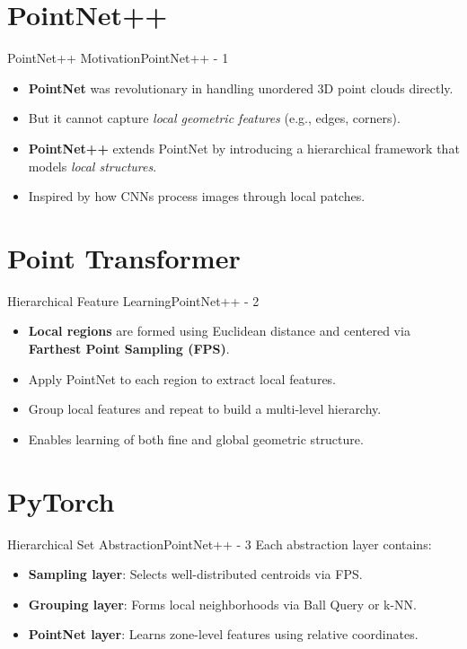 \documentclass{beamer}
\begin{document}
	\section{PointNet++}
		\begin{frame}{PointNet++ Motivation}{PointNet++ - 1}
			\begin{itemize}
				\item \textbf{PointNet} was revolutionary in handling unordered 3D point clouds directly.
				\item But it cannot capture \textit{local geometric features} (e.g., edges, corners).
				\item \textbf{PointNet++} extends PointNet by introducing a hierarchical framework that models \textit{local structures}.
				\item Inspired by how CNNs process images through local patches.
			\end{itemize}
		\end{frame}


	\section{Point Transformer}
		\begin{frame}{Hierarchical Feature Learning}{PointNet++ - 2}
			\begin{itemize}
				\item \textbf{Local regions} are formed using Euclidean distance and centered via \textbf{Farthest Point Sampling (FPS)}.
				\item Apply PointNet to each region to extract local features.
				\item Group local features and repeat to build a multi-level hierarchy.
				\item Enables learning of both fine and global geometric structure.
			\end{itemize}
		\end{frame}

		
	\section{PyTorch}
		\begin{frame}{Hierarchical Set Abstraction}{PointNet++ - 3}
			Each abstraction layer contains:
			\begin{itemize}
				\item \textbf{Sampling layer}: Selects well-distributed centroids via FPS.
				\item \textbf{Grouping layer}: Forms local neighborhoods via Ball Query or k-NN.
				\item \textbf{PointNet layer}: Learns zone-level features using relative coordinates.
			\end{itemize}
		\end{frame}
\end{document}
